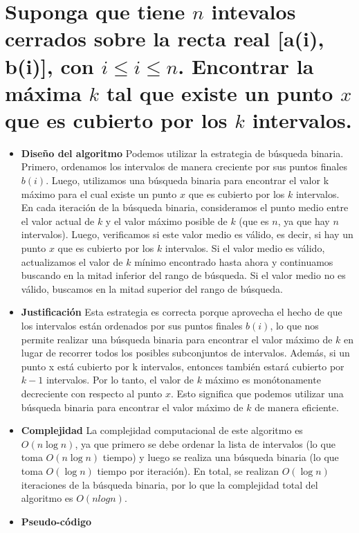 \section{Suponga que tiene $n$ intevalos cerrados sobre la recta real [a(i), b(i)], con $i \leq i \leq n$. Encontrar la máxima $k$ tal que existe un punto $x$ que es cubierto por los $k$ intervalos.}

\begin{itemize}
  \item \textbf{Diseño del algoritmo}
  Podemos utilizar la estrategia de búsqueda binaria. Primero, ordenamos los intervalos de manera creciente por sus puntos finales $b(i)$. Luego, utilizamos una búsqueda binaria para encontrar el valor k máximo para el cual existe un punto $x$ que es cubierto por los $k$ intervalos. En cada iteración de la búsqueda binaria, consideramos el punto medio entre el valor actual de $k$ y el valor máximo posible de $k$ (que es $n$, ya que hay $n$ intervalos). Luego, verificamos si este valor medio es válido, es decir, si hay un punto $x$ que es cubierto por los $k$ intervalos. Si el valor medio es válido, actualizamos el valor de $k$ mínimo encontrado hasta ahora y continuamos buscando en la mitad inferior del rango de búsqueda. Si el valor medio no es válido, buscamos en la mitad superior del rango de búsqueda.

  \item \textbf{Justificación} 
  Esta estrategia es correcta porque aprovecha el hecho de que los intervalos están ordenados por sus puntos finales $b(i)$, lo que nos permite realizar una búsqueda binaria para encontrar el valor máximo de $k$ en lugar de recorrer todos los posibles subconjuntos de intervalos. Además, si un punto x está cubierto por k intervalos, entonces también estará cubierto por $k-1$ intervalos. Por lo tanto, el valor de $k$ máximo es monótonamente decreciente con respecto al punto $x$. Esto significa que podemos utilizar una búsqueda binaria para encontrar el valor máximo de $k$ de manera eficiente.

  \item \textbf{Complejidad}
  La complejidad computacional de este algoritmo es $O(n \log n)$, ya que primero se debe ordenar la lista de intervalos (lo que toma $O(n \log n)$ tiempo) y luego se realiza una búsqueda binaria (lo que toma $O(\log n)$ tiempo por iteración). En total, se realizan $O(\log n)$ iteraciones de la búsqueda binaria, por lo que la complejidad total del algoritmo es $O(n log n)$.
  \item \textbf{Pseudo-código}


\end{itemize}
